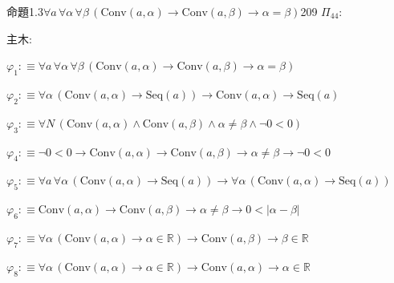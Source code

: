 \begin{fullproof}{命題1.3}{$\forall a\,\forall \alpha\,\forall \beta\,(\mathrm{Conv}(a,\alpha) \to \mathrm{Conv}(a,\beta) \to \alpha = \beta)$}{209}
\noindent$\Pi_{44}$:
\begin{ptree}
\noLine
{}
\end{ptree}
\noindent 主木:
\begin{ptree}
\noLine
{}
\end{ptree}
\begin{abbrevlist}
\item $\varphi_{1} :\equiv \forall a\,\forall \alpha\,\forall \beta\,(\mathrm{Conv}(a,\alpha) \to \mathrm{Conv}(a,\beta) \to \alpha = \beta)$
\item $\varphi_{2} :\equiv \forall \alpha\,(\mathrm{Conv}(a,\alpha) \to \mathrm{Seq}(a)) \to \mathrm{Conv}(a,\alpha) \to \mathrm{Seq}(a)$
\item $\varphi_{3} :\equiv \forall N\,(\mathrm{Conv}(a,\alpha) \land \mathrm{Conv}(a,\beta) \land \alpha \neq \beta \land \neg 0 < 0)$
\item $\varphi_{4} :\equiv \neg 0 < 0 \to \mathrm{Conv}(a,\alpha) \to \mathrm{Conv}(a,\beta) \to \alpha \neq \beta \to \neg 0 < 0$
\item $\varphi_{5} :\equiv \forall a\,\forall \alpha\,(\mathrm{Conv}(a,\alpha) \to \mathrm{Seq}(a)) \to \forall \alpha\,(\mathrm{Conv}(a,\alpha) \to \mathrm{Seq}(a))$
\item $\varphi_{6} :\equiv \mathrm{Conv}(a,\alpha) \to \mathrm{Conv}(a,\beta) \to \alpha \neq \beta \to 0 < \lvert \alpha - \beta \rvert$
\item $\varphi_{7} :\equiv \forall \alpha\,(\mathrm{Conv}(a,\alpha) \to \alpha \in \mathbb{R}) \to \mathrm{Conv}(a,\beta) \to \beta \in \mathbb{R}$
\item $\varphi_{8} :\equiv \forall \alpha\,(\mathrm{Conv}(a,\alpha) \to \alpha \in \mathbb{R}) \to \mathrm{Conv}(a,\alpha) \to \alpha \in \mathbb{R}$

\end{abbrevlist}
\end{fullproof}
